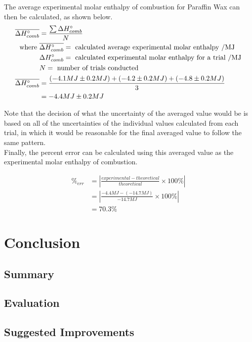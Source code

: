 \documentclass[
	letterpaper, %
	12pt, %
]{CSUniSchoolLabReport}
\begin{document}
The average experimental molar enthalpy of combustion for Paraffin Wax can then be calculated, as shown below.
\begin{align*}
  \overline{\Delta H\degree_{comb}} & = \frac{\sum \Delta H\degree_{comb}}{N}
  \\
  \text{where }                     & \overline{\Delta H\degree_{comb}} = \text{ calculated average experimental molar enthalpy /MJ}
  \\
                                    & \Delta H\degree_{comb} = \text{ calculated experimental molar enthalpy for a trial /MJ}
  \\
                                    & N = \text{ number of trials conducted}
  \\
  \overline{\Delta H\degree_{comb}} & = \frac{(-4.1MJ \pm 0.2 MJ) + (-4.2 \pm 0.2 MJ) + (-4.8 \pm 0.2 MJ)}{3}
  \\
                                    & = -4.4MJ \pm 0.2 MJ
\end{align*}

Note that the decision of what the uncertainty of the averaged value would be is based on all of
the uncertainties of the individual values calculated from each trial, in which it would be reasonable
for the final averaged value to follow the same pattern.
\\
Finally, the percent error can be calculated using this averaged value as the experimental molar enthalpy of combustion.

\begin{align*}
  \%_{err} & = \left|\frac{experimental - theoretical}{theoretical} \times 100\%\right|
  \\
           & = \left|\frac{-4.4MJ - (-14.7MJ)}{-14.7MJ} \times 100\%\right|
  \\
           & = 70.3\%
\end{align*}

\section{Conclusion}

\subsection{Summary}



\subsection{Evaluation}

\subsection{Suggested Improvements}


\printbibliography %

\end{document}
